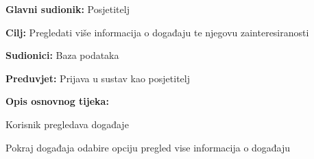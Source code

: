 				\noindent {}
				\begin{packed_item}
					
					\item \textbf{Glavni sudionik: }Posjetitelj
					\item  \textbf{Cilj:} Pregledati više informacija o događaju te njegovu zainteresiranosti
					\item  \textbf{Sudionici:} Baza podataka
					\item  \textbf{Preduvjet:} Prijava u sustav kao posjetitelj
					\item  \textbf{Opis osnovnog tijeka:}
					
					\item[] \begin{packed_enum}
						
						\item Korisnik pregledava događaje
						\item Pokraj događaja odabire opciju pregled vise informacija o događaju
					\end{packed_enum}
				\end{packed_item}
				
